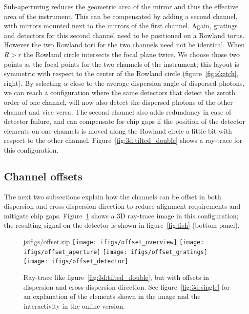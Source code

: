 \documentclass[linenumbers]{aastex631}
\begin{document}
Sub-aperturing reduces the geometric area of the mirror and thus the effective area of the instrument. This can be compensated by adding a second channel, with mirrors mounted next to the mirrors of the first channel. Again, gratings and detectors for this second channel need to be positioned on a Rowland torus. However the two Rowland tori for the two channels need not be identical. When $R> r$ the Rowland circle intersects the focal plane twice. We choose those two points as the focal points for the two channels of the instrument; this layout is symmetric with respect to the center of the Rowland circle (figure~\ref{fig:sketch}, right). By selecting $\alpha$ close to the average dispersion angle of dispersed photons, we can reach a configuration where the same detectors that detect the zeroth order of one channel, will now also detect the dispersed photons of the other channel and vice versa. The second channel also adds redundancy in case of detector failure, and can compensate for chip gaps if the position of the detector elements on one channels is moved along the Rowland circle a little bit with respect to the other channel. Figure~\ref{fig:3d:tilted_double} shows a ray-trace for this configuration.

\subsection{Channel offsets}
The next two subsections explain how the channels can be offset in both dispersion and cross-dispersion direction to reduce alignment requirements and mitigate chip gaps. Figure~\ref{fig:3d:tilted_double_offset} shows a 3D ray-trace image in this configuration; the resulting signal on the detector is shown in figure~\ref{fig:fish} (bottom panel).

\begin{figure}
    \begin{interactive}{js}{ifigs/offset.zip}
    \texttt{[image: ifigs/offset\_overview]}
    \texttt{[image: ifigs/offset\_aperture]}
    \texttt{[image: ifigs/offset\_gratings]}
    \texttt{[image: ifigs/offset\_detector]}
    \end{interactive}
    \caption{Ray-trace like figure~\ref{fig:3d:tilted_double}, but with offsets in dispersion and cross-dispersion direction. See figure~\ref{fig:3d:single} for an explanation of the elements shown in the image and the interactivity in the online version.
        }
    \label{fig:3d:tilted_double_offset}
\end{figure}
\end{document}
